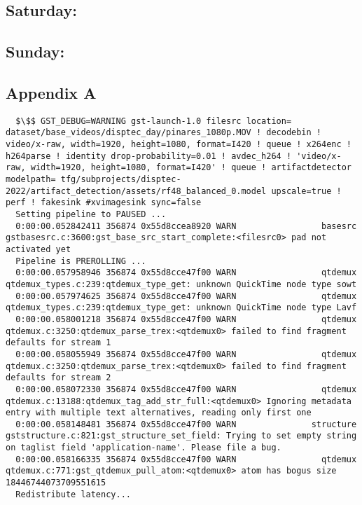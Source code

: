 \documentclass[12pt,oneside]{book}
\begin{document}
  \subsection*{Saturday:}

  \subsection*{Sunday:}


\subsection*{Appendix A}

\begin{lstlisting}
  $\$$ GST_DEBUG=WARNING gst-launch-1.0 filesrc location= dataset/base_videos/disptec_day/pinares_1080p.MOV ! decodebin ! video/x-raw, width=1920, height=1080, format=I420 ! queue ! x264enc ! h264parse ! identity drop-probability=0.01 ! avdec_h264 ! 'video/x-raw, width=1920, height=1080, format=I420' ! queue ! artifactdetector modelpath= tfg/subprojects/disptec-2022/artifact_detection/assets/rf48_balanced_0.model upscale=true ! perf ! fakesink #xvimagesink sync=false
  Setting pipeline to PAUSED ...
  0:00:00.052842411 356874 0x55d8ccea8920 WARN                 basesrc gstbasesrc.c:3600:gst_base_src_start_complete:<filesrc0> pad not activated yet
  Pipeline is PREROLLING ...
  0:00:00.057958946 356874 0x55d8cce47f00 WARN                 qtdemux qtdemux_types.c:239:qtdemux_type_get: unknown QuickTime node type sowt
  0:00:00.057974625 356874 0x55d8cce47f00 WARN                 qtdemux qtdemux_types.c:239:qtdemux_type_get: unknown QuickTime node type Lavf
  0:00:00.058001218 356874 0x55d8cce47f00 WARN                 qtdemux qtdemux.c:3250:qtdemux_parse_trex:<qtdemux0> failed to find fragment defaults for stream 1
  0:00:00.058055949 356874 0x55d8cce47f00 WARN                 qtdemux qtdemux.c:3250:qtdemux_parse_trex:<qtdemux0> failed to find fragment defaults for stream 2
  0:00:00.058072330 356874 0x55d8cce47f00 WARN                 qtdemux qtdemux.c:13188:qtdemux_tag_add_str_full:<qtdemux0> Ignoring metadata entry with multiple text alternatives, reading only first one
  0:00:00.058148481 356874 0x55d8cce47f00 WARN               structure gststructure.c:821:gst_structure_set_field: Trying to set empty string on taglist field 'application-name'. Please file a bug.
  0:00:00.058166335 356874 0x55d8cce47f00 WARN                 qtdemux qtdemux.c:771:gst_qtdemux_pull_atom:<qtdemux0> atom has bogus size 18446744073709551615
  Redistribute latency...

\end{lstlisting}
\end{document}
